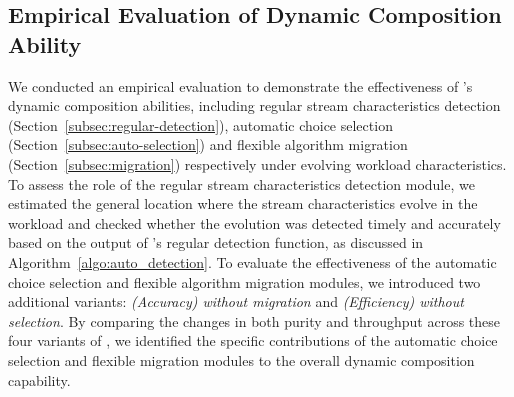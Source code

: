  
\subsection{Empirical Evaluation of Dynamic Composition Ability}
We conducted an empirical evaluation to demonstrate the effectiveness of \algo's dynamic composition abilities, including regular stream characteristics detection (Section~\ref{subsec:regular-detection}), automatic choice selection (Section~\ref{subsec:auto-selection}) and flexible algorithm migration (Section~\ref{subsec:migration}) respectively under evolving workload characteristics. 
To assess the role of the regular stream characteristics detection module, we estimated the general location where the stream characteristics evolve in the workload and checked whether the evolution was detected timely and accurately based on the output of \algo's regular detection function, as discussed in Algorithm~\ref{algo:auto_detection}. To evaluate the effectiveness of the automatic choice selection and flexible algorithm migration modules, we introduced two additional variants: \algo \textit{(Accuracy) without migration} and \algo \textit{(Efficiency) without selection}. By comparing the changes in both purity and throughput across these four variants of \algo, we identified the specific contributions of the automatic choice selection and flexible migration modules to the overall dynamic composition capability.

